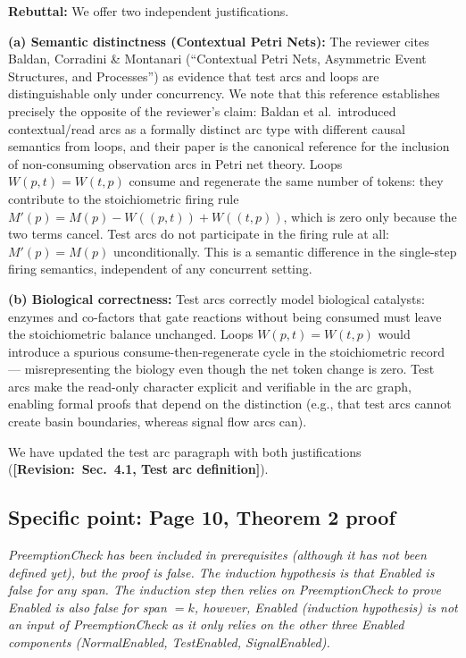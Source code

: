 \documentclass[11pt,letterpaper]{article}
\newcommand{\rquote}[1]{\begin{mdframed}[style=reviewquote]\textit{#1}\end{mdframed}}
\newcommand{\sref}[1]{\textbf{[Revision:~#1]}}
\newcommand{\rebuttal}[1]{\textcolor{green!40!black}{\textbf{Rebuttal:} #1}}
\begin{document}
\rebuttal{We offer two independent justifications.

\textbf{(a) Semantic distinctness (Contextual Petri Nets):}
The reviewer cites Baldan, Corradini \& Montanari (``Contextual Petri Nets,
Asymmetric Event Structures, and Processes'') as evidence that test arcs and
loops are distinguishable only under concurrency.
We note that this reference establishes precisely the opposite of the
reviewer's claim: Baldan et al.\ introduced contextual/read arcs as a
formally distinct arc type with different causal semantics from loops, and
their paper is the canonical reference for the inclusion of non-consuming
observation arcs in Petri net theory.
Loops $W(p,t) = W(t,p)$ consume and regenerate the same number of tokens:
they contribute to the stoichiometric firing rule
$M'(p) = M(p) - W((p,t)) + W((t,p))$, which is zero only because the
two terms cancel.
Test arcs do not participate in the firing rule at all:
$M'(p) = M(p)$ unconditionally.
This is a semantic difference in the single-step firing semantics,
independent of any concurrent setting.

\textbf{(b) Biological correctness:}
Test arcs correctly model biological catalysts: enzymes and co-factors
that gate reactions without being consumed must leave the stoichiometric
balance unchanged.
Loops $W(p,t) = W(t,p)$ would introduce a spurious consume-then-regenerate
cycle in the stoichiometric record --- misrepresenting the biology even
though the net token change is zero.
Test arcs make the read-only character explicit and verifiable in the arc
graph, enabling formal proofs that depend on the distinction (e.g., that
test arcs cannot create basin boundaries, whereas signal flow arcs can).

We have updated the test arc paragraph with both justifications
(\sref{Sec.~4.1, Test arc definition}).}

\subsection*{Specific point: Page 10, Theorem 2 proof}

\rquote{PreemptionCheck has been included in prerequisites (although it has
not been defined yet), but the proof is false.
The induction hypothesis is that Enabled is false for any span.
The induction step then relies on PreemptionCheck to prove Enabled is also
false for span $= k$, however, Enabled (induction hypothesis) is not an
input of PreemptionCheck as it only relies on the other three Enabled
components (NormalEnabled, TestEnabled, SignalEnabled).}
\end{document}

